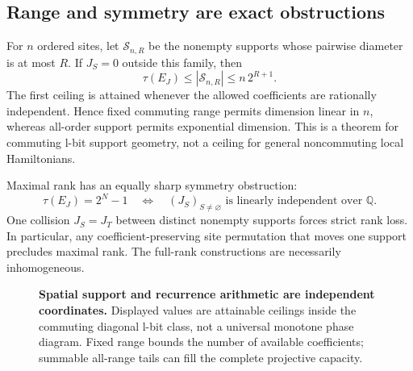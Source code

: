 \documentclass[10pt]{article}
\theoremstyle{definition}
\newcommand{\Q}{\mathbb Q}
\begin{document}
\subsection{Range and symmetry are exact obstructions}

For \(n\) ordered sites, let \(\mathcal S_{n,R}\) be the nonempty supports
whose pairwise diameter is at most \(R\). If \(J_S=0\) outside this family,
then
\begin{equation}
 \boxed{
 \tau(E_J)\le|\mathcal S_{n,R}|\le n\,2^{R+1}.}
 \label{eq:range}
\end{equation}
The first ceiling is attained whenever the allowed coefficients are
rationally independent. Hence fixed commuting range permits dimension
linear in \(n\), whereas all-order support permits exponential dimension.
This is a theorem for commuting l-bit support geometry, not a ceiling for
general noncommuting local Hamiltonians.

Maximal rank has an equally sharp symmetry obstruction:
\begin{equation}
 \tau(E_J)=2^N-1
 \quad\Longleftrightarrow\quad
 (J_S)_{S\ne\varnothing}
 \text{ is linearly independent over }\Q.
 \label{eq:independence}
\end{equation}
One collision \(J_S=J_T\) between distinct nonempty supports forces strict
rank loss. In particular, any coefficient-preserving site permutation that
moves one support precludes maximal rank. The full-rank constructions are
necessarily inhomogeneous.

\begin{figure}[t]
\centering
{}
\caption{\textbf{Spatial support and recurrence arithmetic are independent
coordinates.} Displayed values are attainable ceilings inside the
commuting diagonal l-bit class, not a universal monotone phase diagram.
Fixed range bounds the number of available coefficients; summable all-range
tails can fill the complete projective capacity.}
\label{fig:capacity}
\end{figure}
\end{document}
